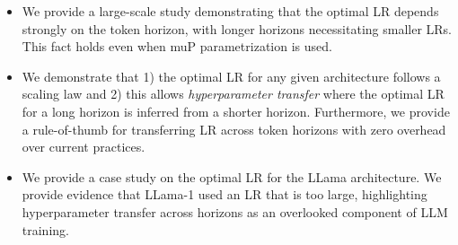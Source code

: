 \begin{itemize}
    \item We provide a large-scale study demonstrating that the optimal LR depends strongly on the token horizon, with longer horizons necessitating smaller LRs. This fact holds even when muP parametrization is used.
    \item We demonstrate that 1) the optimal LR for any given architecture follows a scaling law and 2) this allows \textit{hyperparameter transfer} where the optimal LR for a long horizon is inferred from a shorter horizon. Furthermore, we provide a rule-of-thumb for transferring LR across token horizons with zero overhead over current practices.
    \item We provide a case study on the optimal LR for the LLama architecture. We provide evidence that LLama-1 used an LR that is too large, highlighting hyperparameter transfer across horizons as an overlooked component of LLM training. 
\end{itemize}


